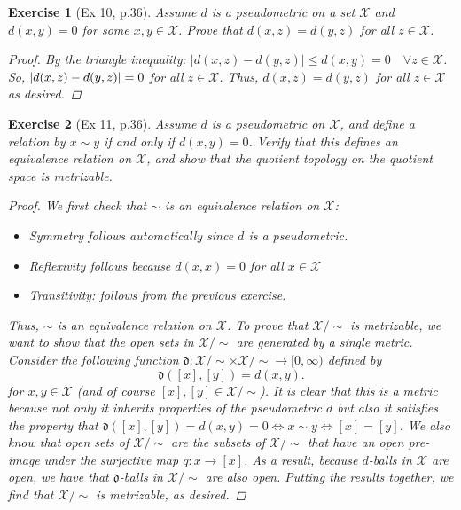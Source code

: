 \documentclass[11pt]{article}
\newtheorem{exercise}{Exercise}
\newcommand{\X}{\mathcal{X}}
\begin{document}
\begin{exercise}[Ex 10, p.36]
	Assume $d$ is a pseudometric on a set $\X$ and $d(x, y) = 0$ for some $x, y \in \X$. Prove that $d(x,z) = d(y,z)$ for all $z\in \X$.
	\begin{proof}
		By the triangle inequality: $|d(x,z) - d(y,z)| \leq d(x,y) = 0 \quad \forall z\in \X$. So, $\abs{d(x,z) - d(y,z)} = 0$ for all $z\in \X$. Thus, $d(x,z) = d(y,z)$ for all $z\in \X$ as desired. 
	\end{proof}
\end{exercise}


\begin{exercise}[Ex 11, p.36]
	Assume $d$ is a pseudometric on $\X$, and define a relation by $x \sim y$ if and only if $d(x, y) = 0$. Verify that this defines an equivalence relation on $\X$, and show that the quotient topology on the quotient space is metrizable.
	\begin{proof}
		We first check that $\sim$ is an equivalence relation on $\X$:
		\begin{itemize}
			\item Symmetry follows automatically since $d$ is a pseudometric.
			\item Reflexivity follows because $d(x,x) = 0$ for all $x\in \X$
			\item Transitivity: follows from the previous exercise. 
		\end{itemize}
		Thus, $\sim$ is an equivalence relation on $\X$. To prove that $\X/\sim$ is metrizable, we want to show that the open sets in $\X/\sim$ are generated by a single metric. Consider the following function $\mathfrak{d}: \X/\sim \times \X/\sim \to [0,\infty)$ defined by 
		\begin{equation*}
		\mathfrak{d}([x],[y]) = d(x,y).
		\end{equation*}
		for $x,y\in \X$ (and of course $[x],[y]\in \X/\sim$). It is clear that this is a metric because not only it inherits properties of the pseudometric $d$ but also it satisfies the property that $\mathfrak{d}([x],[y]) = d(x,y) =  0 \iff x \sim y \iff [x] = [y]$. We also know that open sets of $\X/\sim$ are the subsets of $\X/\sim$ that have an open pre-image under the surjective map $q: x \to [x]$. As a result, because $d$-balls in $\X$ are open, we have that $\mathfrak{d}$-balls in $\X/\sim$ are also open. Putting the results together, we find that $\X/\sim$ is metrizable, as desired.
	\end{proof}
\end{exercise}
\end{document}
